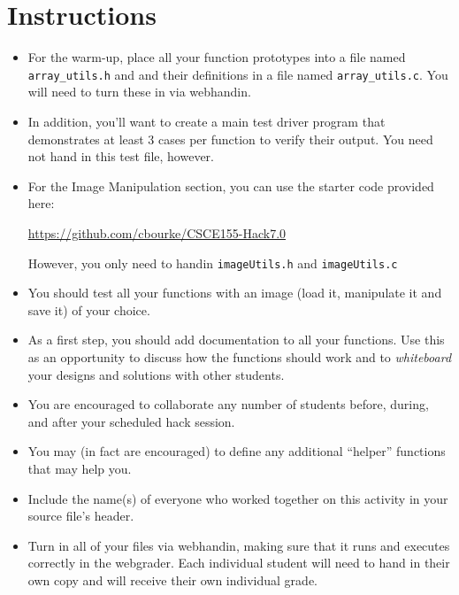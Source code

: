 \documentclass[12pt]{scrartcl}
\begin{document}
\section*{Instructions}




\begin{itemize}

  \item For the warm-up, place all your function prototypes into a file 
  named \texttt{array_utils.h} and and their definitions in a
  file named \texttt{array_utils.c}.  You will need to turn
  these in via webhandin.
  
  \item In addition, you'll want to create a main test driver program 
  that demonstrates at least 3 cases per function to verify their output.  
  You need not hand in this test file, however.
  
  \item For the Image Manipulation section, you can use the starter code
  provided here:
  
  \url{https://github.com/cbourke/CSCE155-Hack7.0}
  
  However, you only need to handin \texttt{imageUtils.h} and
  \texttt{imageUtils.c}

  \item You should test all your functions with an image (load it, manipulate
  it and save it) of your choice.
  \item As a first step, you should add documentation to all your functions.
  Use this as an opportunity to discuss how the functions should work and
  to \emph{whiteboard} your designs and solutions with other students.
  
  \item You are encouraged to collaborate any number of students 
  before, during, and after your scheduled hack session.  

  \item You may (in fact are encouraged) to define any additional
  ``helper'' functions that may help you.
  \item Include the name(s) of everyone who worked together on
  this activity in your source file's header.

  \item Turn in all of your files via webhandin, making sure that 
  it runs and executes correctly in the webgrader.  Each individual 
  student will need to hand in their own copy and will receive 
  their own individual grade.
\end{itemize}  
\end{document}
